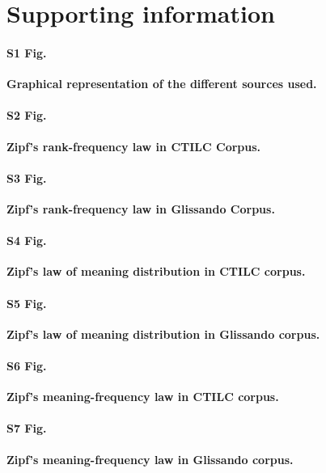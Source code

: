 \documentclass[10pt,letterpaper]{article}
\begin{document}
\section*{Supporting information}

\paragraph*{S1 Fig.}
\label{S1_Fig}

\textbf{Graphical representation of the different sources used.} %

\paragraph*{S2 Fig.}
\label{S2_Fig}

\textbf{Zipf's rank-frequency law in CTILC Corpus.} %

\paragraph*{S3 Fig.}
\label{S3_Fig}

\textbf{Zipf's rank-frequency law in Glissando Corpus.} %

\paragraph*{S4 Fig.}
\label{S4_Fig}

\textbf{Zipf's law of meaning distribution in CTILC corpus.} %

\paragraph*{S5 Fig.}
\label{S5_Fig}

\textbf{Zipf's law of meaning distribution in Glissando corpus.} %

\paragraph*{S6 Fig.}
\label{S6_Fig}

\textbf{Zipf's meaning-frequency law in CTILC corpus.} %

\paragraph*{S7 Fig.}
\label{S7_Fig}

\textbf{Zipf's meaning-frequency law in Glissando corpus.} %
\end{document}
